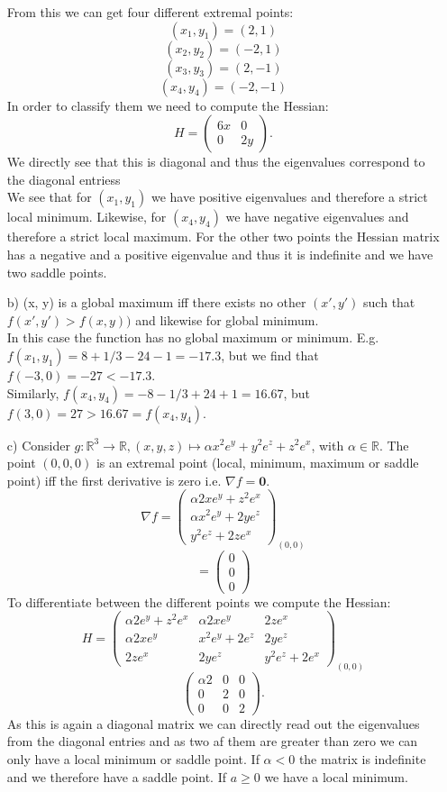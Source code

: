 \documentclass[10pt]{article}
\numberwithin{equation}{section}
\begin{document}
\begin{enumerate}
{From this we can get four different extremal points:
$$(x_1, y_1) = (2, 1)$$
$$(x_2, y_2) = (-2, 1) $$
$$(x_3, y_3) = (2, -1) $$
$$ (x_4, y_4) = (-2, -1) $$
In order to classify them we need to compute the Hessian: 
$$
H = \begin{pmatrix} 6x & 0 \\
0 & 2y \end{pmatrix}.
$$
We directly see that this is diagonal and thus the eigenvalues correspond to the diagonal entriess \\
We see that  for $(x_1, y_1)$ we have positive eigenvalues and therefore a strict  local minimum. Likewise, for $(x_4, y_4)$ we have negative eigenvalues and therefore a strict local  maximum. For the other two points the Hessian matrix has a negative and a positive eigenvalue and thus it is indefinite and we have two saddle points.}
\item[b)] {
(x, y) is a global maximum iff there exists no other $(x', y')$ such that $f(x', y') > f(x, y))$ and likewise for global minimum. \\
In this case the function has no global maximum or minimum. E.g. $f(x_1, y_1) = 8 + 1/3 -24 -1 = -17.3$, but we find that $f(-3, 0) = -27 < -17.3$. \\
Similarly, $f(x_4, y_4) = -8 - 1/3 + 24 +1 = 16.67$, but $f(3, 0)= 27 > 16.67 = f(x_4, y_4)$. 
}
\item[c)] {
Consider $g: \mathbb{R}^3 \to \mathbb{R}, (x, y, z) \mapsto \alpha x^2e^y + y^2 e^z + z^2 e^x$, with $\alpha \in \mathbb{R}$. 
The point $(0, 0, 0)$ is an extremal point (local, minimum, maximum or saddle point) iff the first derivative is zero i.e. $\nabla f = \textbf{0}$.
$$
\nabla f = \begin{pmatrix} \alpha 2x e^y + z^2 e^x\\ \alpha x^2 e^y + 2y e^z \\ y^2 e^z + 2z e^x \end{pmatrix}_{(0, 0)}
$$
$$
= \begin{pmatrix} 0 \\ 0 \\ 0 \end{pmatrix}
$$
To differentiate between the different points we compute the Hessian:
$$
H = {\begin{pmatrix}
\alpha 2 e^y + z^2e^x & \alpha 2x e^y & 2z e^x \\
\alpha 2x e^y  & x^2 e^y + 2 e^z & 2ye^z \\
2z e^x & 2y e^z & y^2 e^z + 2 e^x
\end{pmatrix}}_{(0, 0)}
$$
$$
\begin{pmatrix}
\alpha 2   &  0& 0  \\
0  & 2 & 0 \\
0 & 0 &  2 
\end{pmatrix}.
$$
As this is again a diagonal matrix we can directly read out the eigenvalues from the diagonal entries and as two af them are greater than zero we can only have a local minimum or saddle point. If $\alpha <0$ the matrix is indefinite and we therefore have a saddle point. If $a\geq 0$ we have a local minimum. 
}
\end{enumerate}
\end{document}
